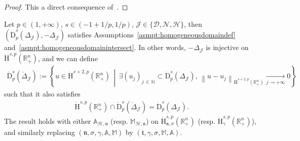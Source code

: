 \documentclass[10pt]{amsart}
\theoremstyle{definition}\newtheorem{defi}[theo]{Definition}\newtheorem{rema}[theo]{Remark}\newtheorem{exam}[theo]{Example}\newtheorem{exem}[theo]{Example}\newtheorem{nota}[theo]{Notation}
\newcommand{\bbA}{\mathbb{A}}
\newcommand{\bbR}{\mathbb{R}}
\newcommand{\bbN}{\mathbb{N}}
\newcommand{\bbM}{\mathbb{M}}
\newcommand{\rmH}{\mathrm{H}}%
\newcommand{\rmD}{\mathrm{D}}
\newcommand{\clH}{\mathcal{H}}
\newcommand{\clN}{\mathcal{N}}
\newcommand{\clJ}{\mathcal{J}}
\newcommand{\clD}{\mathcal{D}}
\newcommand{\fkn}{\mathfrak{n}}
\newcommand{\fkt}{\mathfrak{t}}
\let\oldexists\exists
\renewcommand*{\exists}{\mathrel{\oldexists}}
\begin{document}
\begin{proof}
This a direct consequence of~\cite[Proposition~B.2, Coro\-llary~B.3]{Gaudin2022}.
\end{proof}


\begin{prop}\label{prop:assumptionsareCheckedforLap}
Let $p\in(1,+\infty)$, $s\in(-1+1/p,1/p)$, $\clJ\in\{\clD,\clN,\clH\}$, then $(\dot{\rmD}^{s}_{p}(\Delta_\clJ),-\Delta_\clJ)$ satisfies Assumptions~\ref{asmpt:homogeneousdomaindef} and~\ref{asmpt:homogeneousdomainintersect}. In other words, $-\Delta_\clJ$ is injective on $\dot{\rmH}^{s,p}(\bbR^n_+)$, and we can define
\begin{align*}
\dot{\rmD}^{s}_{p}\left(\mathring{\Delta}_\clJ\right):= \left\{ u\in \dot{\rmH}^{s+2,p}\left(\bbR^n_+\right)\,\middle|\,\exists (u_j)_{j\,\in\,\bbN}\subset\dot{\rmD}^{s}_{p}(\Delta_\clJ),\,\left\| u-u_j \right\|_{\dot{\rmH}^{s+2,p}\left(\bbR^n_+\right)} \xrightarrow[j\rightarrow +\infty]{} 0 \right\}
\end{align*}
such that it also satisfies
\begin{align}\label{eq:IntersectHomogeneousDomainsLap}
\dot{\rmH}^{s,p}\left(\bbR^n_+\right)\cap\dot{\rmD}^{s}_{p}\left(\mathring{\Delta}_\clJ\right) = \dot{\rmD}^{s}_{p}({\Delta}_\clJ).
\end{align}
The result holds with either $\bbA_{\clH,\fkn}$ (resp. $\bbM_{\clH,\fkn}$) on $\dot{\rmH}^{s,p}_{\fkn,\sigma}(\bbR^n_+)$ (resp. $\dot{\rmH}^{s,p}_{\gamma}(\bbR^n_+)$), and similarly replacing $(\fkn,\sigma,\gamma,\bbA,\bbM)$ by $(\fkt,\gamma,\sigma,\bbM,\bbA)$.
\end{prop}
\end{document}

